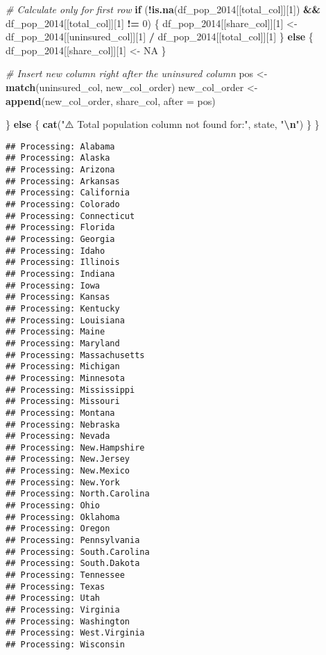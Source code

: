 \documentclass[
]{article}
\newenvironment{Shaded}{\begin{snugshade}}{\end{snugshade}}
\newcommand{\AttributeTok}[1]{\textcolor[rgb]{0.13,0.29,0.53}{#1}}
\newcommand{\CommentTok}[1]{\textcolor[rgb]{0.56,0.35,0.01}{\textit{#1}}}
\newcommand{\ConstantTok}[1]{\textcolor[rgb]{0.56,0.35,0.01}{#1}}
\newcommand{\ControlFlowTok}[1]{\textcolor[rgb]{0.13,0.29,0.53}{\textbf{#1}}}
\newcommand{\DecValTok}[1]{\textcolor[rgb]{0.00,0.00,0.81}{#1}}
\newcommand{\FunctionTok}[1]{\textcolor[rgb]{0.13,0.29,0.53}{\textbf{#1}}}
\newcommand{\NormalTok}[1]{#1}
\newcommand{\OtherTok}[1]{\textcolor[rgb]{0.56,0.35,0.01}{#1}}
\newcommand{\SpecialCharTok}[1]{\textcolor[rgb]{0.81,0.36,0.00}{\textbf{#1}}}
\newcommand{\StringTok}[1]{\textcolor[rgb]{0.31,0.60,0.02}{#1}}
\begin{document}
\begin{Shaded}
\begin{Highlighting}[]
    \CommentTok{\# Calculate only for first row}
    \ControlFlowTok{if}\NormalTok{ (}\SpecialCharTok{!}\FunctionTok{is.na}\NormalTok{(df\_pop\_2014[[total\_col]][}\DecValTok{1}\NormalTok{]) }\SpecialCharTok{\&\&}\NormalTok{ df\_pop\_2014[[total\_col]][}\DecValTok{1}\NormalTok{] }\SpecialCharTok{!=} \DecValTok{0}\NormalTok{) \{}
\NormalTok{      df\_pop\_2014[[share\_col]][}\DecValTok{1}\NormalTok{] }\OtherTok{\textless{}{-}}\NormalTok{ df\_pop\_2014[[uninsured\_col]][}\DecValTok{1}\NormalTok{] }\SpecialCharTok{/}\NormalTok{ df\_pop\_2014[[total\_col]][}\DecValTok{1}\NormalTok{]}
\NormalTok{    \} }\ControlFlowTok{else}\NormalTok{ \{}
\NormalTok{      df\_pop\_2014[[share\_col]][}\DecValTok{1}\NormalTok{] }\OtherTok{\textless{}{-}} \ConstantTok{NA}
\NormalTok{    \}}
    
    \CommentTok{\# Insert new column right after the uninsured column}
\NormalTok{    pos }\OtherTok{\textless{}{-}} \FunctionTok{match}\NormalTok{(uninsured\_col, new\_col\_order)}
\NormalTok{    new\_col\_order }\OtherTok{\textless{}{-}} \FunctionTok{append}\NormalTok{(new\_col\_order, share\_col, }\AttributeTok{after =}\NormalTok{ pos)}
    
\NormalTok{  \} }\ControlFlowTok{else}\NormalTok{ \{}
    \FunctionTok{cat}\NormalTok{(}\StringTok{"⚠️ Total population column not found for:"}\NormalTok{, state, }\StringTok{"}\SpecialCharTok{\textbackslash{}n}\StringTok{"}\NormalTok{)}
\NormalTok{  \}}
\NormalTok{\}}
\end{Highlighting}
\end{Shaded}

\begin{verbatim}
## Processing: Alabama 
## Processing: Alaska 
## Processing: Arizona 
## Processing: Arkansas 
## Processing: California 
## Processing: Colorado 
## Processing: Connecticut 
## Processing: Florida 
## Processing: Georgia 
## Processing: Idaho 
## Processing: Illinois 
## Processing: Indiana 
## Processing: Iowa 
## Processing: Kansas 
## Processing: Kentucky 
## Processing: Louisiana 
## Processing: Maine 
## Processing: Maryland 
## Processing: Massachusetts 
## Processing: Michigan 
## Processing: Minnesota 
## Processing: Mississippi 
## Processing: Missouri 
## Processing: Montana 
## Processing: Nebraska 
## Processing: Nevada 
## Processing: New.Hampshire 
## Processing: New.Jersey 
## Processing: New.Mexico 
## Processing: New.York 
## Processing: North.Carolina 
## Processing: Ohio 
## Processing: Oklahoma 
## Processing: Oregon 
## Processing: Pennsylvania 
## Processing: South.Carolina 
## Processing: South.Dakota 
## Processing: Tennessee 
## Processing: Texas 
## Processing: Utah 
## Processing: Virginia 
## Processing: Washington 
## Processing: West.Virginia 
## Processing: Wisconsin
\end{verbatim}
\end{document}
